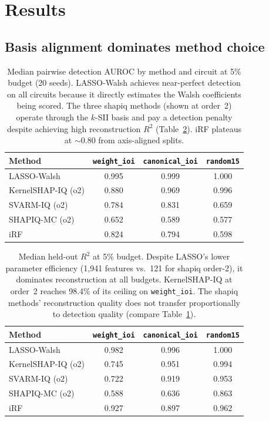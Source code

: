 \documentclass[11pt]{article}
\begin{document}
\section{Results}
\label{sec:results}

\subsection{Basis alignment dominates method choice}
\label{sec:basis-alignment}

\begin{table}[t]
\centering
\caption{Median pairwise detection AUROC by method and circuit at 5\%
budget (20 seeds). LASSO-Walsh achieves near-perfect detection on all
circuits because it directly estimates the Walsh coefficients being
scored. The three shapiq methods (shown at order~2) operate through
the $k$-SII basis and pay a detection penalty despite achieving high
reconstruction $R^2$ (Table~\ref{tab:r2}). iRF plateaus at
$\sim$0.80 from axis-aligned splits.}
\label{tab:auroc}
\begin{tabular}{lccc}
\toprule
Method & \texttt{weight\_ioi} & \texttt{canonical\_ioi} & \texttt{random15} \\
\midrule
LASSO-Walsh        & 0.995 & 0.999 & 1.000 \\
KernelSHAP-IQ (o2) & 0.880 & 0.969 & 0.996 \\
SVARM-IQ (o2)      & 0.784 & 0.831 & 0.659 \\
SHAPIQ-MC (o2)     & 0.652 & 0.589 & 0.577 \\
iRF                & 0.824 & 0.794 & 0.598 \\
\bottomrule
\end{tabular}
\end{table}

\begin{table}[t]
\centering
\caption{Median held-out $R^2$ at 5\% budget. Despite LASSO's lower
parameter efficiency (1{,}941 features vs.\ 121 for shapiq order-2),
it dominates reconstruction at all budgets. KernelSHAP-IQ at order~2
reaches 98.4\% of its ceiling on \texttt{weight\_ioi}. The shapiq
methods' reconstruction quality does not transfer proportionally to
detection quality (compare Table~\ref{tab:auroc}).}
\label{tab:r2}
\begin{tabular}{lccc}
\toprule
Method & \texttt{weight\_ioi} & \texttt{canonical\_ioi} & \texttt{random15} \\
\midrule
LASSO-Walsh        & 0.982 & 0.996 & 1.000 \\
KernelSHAP-IQ (o2) & 0.745 & 0.951 & 0.994 \\
SVARM-IQ (o2)      & 0.722 & 0.919 & 0.953 \\
SHAPIQ-MC (o2)     & 0.588 & 0.636 & 0.863 \\
iRF                & 0.927 & 0.897 & 0.962 \\
\bottomrule
\end{tabular}
\end{table}
\end{document}
